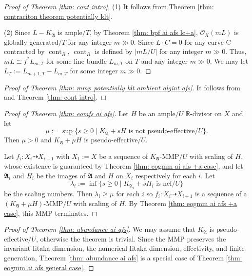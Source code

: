 \documentclass[12pt]{amsart}
\numberwithin{equation}{section}
\newcommand{\Rr}{\mathbb{R}}
\newcommand{\cont}{\operatorname{cont}}
\newcommand{\Aa}{{\mathfrak{A}}}
\theoremstyle{definition}
\theoremstyle{definition}
\theoremstyle{definition}
\begin{document}
\begin{proof}[Proof of Theorem \ref{thm: cont intro}]
(1) It follows from Theorem \ref{thm: contraciton theorem potentially klt}.

(2) Since $L-K_{\Aa}$ is ample$/T$, by Theorem \ref{thm: bpf ai afs lc+a}, $\mathcal{O}_X(mL)$ is globally generated$/T$ for any integer $m\gg 0$. Since $L\cdot C=0$ for any curve C contracted by $\cont_R$, $\cont_R$ is defined
by $|mL/U|$ for any integer $m\gg 0$. Thus, $mL\cong f^\ast L_{m,T}$ for some line bundle $L_{m,T}$ on $T$ and any integer $m\gg 0$. We may let $L_T:=L_{m+1,T}-L_{m,T}$ for some integer $m\gg 0$.
\end{proof}

\begin{proof}[Proof of Theorem \ref{thm: mmp potentially klt ambient algint afs}]
    It follows from \cite[Theorems 1.3,1.5]{CHLMSSX24} and Theorem \ref{thm: cont intro}.
\end{proof}


\begin{proof}[Proof of Theorem \ref{thm: eomfs ai afs}]
    Let $H$ be an ample$/U$ $\Rr$-divisor on $X$ and let 
    $$\mu:=\sup\{s\geq 0\mid K_{\Aa}+sH\text{ is not pseudo-effective}/U\}.$$
    Then $\mu>0$ and $K_{\Aa}+\mu H$ is pseudo-effective$/U$. 
    
    Let $f_i: X_i\dashrightarrow X_{i+1}$ with $X_1:=X$ be a sequence of $K_{\Aa}$-MMP$/U$ with scaling of $H$, whose existence is guaranteed by Theorem \ref{thm: eogmm ai afs +a case}, and let $\Aa_i$ and $H_i$ be the images of $\Aa$ and $H$ on $X_i$ respectively for each $i$. Let
    $$\lambda_i:=\inf\{s\geq 0\mid K_{\Aa_i}+sH_i\text{ is nef}/U\}$$
    be the scaling numbers. Then $\lambda_i\geq\mu$ for each $i$ so $f_i\colon X_i\dashrightarrow X_{i+1}$ is a sequence of a$(K_{\Aa}+\mu H)$-MMP$/U$ with scaling of $H$. By Theorem \ref{thm: eogmm ai afs +a case}, this MMP terminates.
\end{proof}



\begin{proof}[Proof of Theorem \ref{thm: abundance ai afs}]
We may assume that $K_{\Aa}$ is pseudo-effective$/U$, otherwise the theorem is trivial. Since the MMP preserves the invariant Iitaka dimension, the numerical Iitaka dimension, effectivity, and finite generation, Theorem \ref{thm: abundance ai afs} is a special case of Theorem \ref{thm: eogmm ai afs general case}.
\end{proof}
\end{document}
